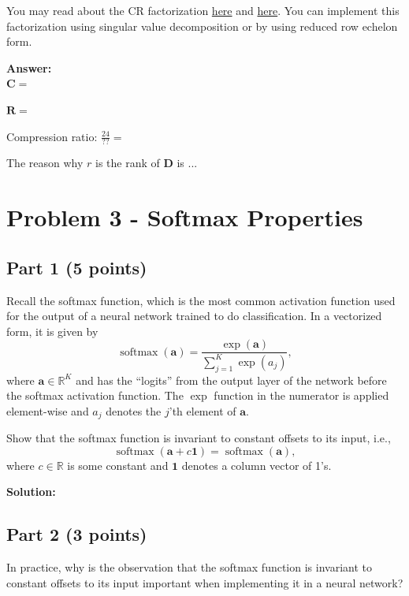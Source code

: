 \documentclass[11pt, oneside]{article}   	%
\begin{document}
You may read about the CR factorization \href{https://blogs.mathworks.com/cleve/2020/10/23/gil-strang-and-the-cr-matrix-factorization/}{here} and \href{https://en.wikipedia.org/wiki/Rank_factorization}{here}. You can implement this factorization using singular value decomposition or by using reduced row echelon form.

\textbf{Answer:} \\

$\mathbf{C} =$ 

$\mathbf{R} =$

Compression ratio: $\frac{24}{??} = $

The reason why $r$ is the rank of $\mathbf{D}$ is ...


\clearpage


\clearpage


\section*{Problem 3 - Softmax Properties}

\subsection*{Part 1 (5 points)}
Recall the softmax function, which is the most common activation function used for the output of a neural network trained to do classification. In a vectorized form, it is given by
\begin{equation*}
\operatorname{softmax} \left( {\mathbf{a}} \right) = \frac{{\exp \left( {\mathbf{a}} \right)}}
{{\sum\nolimits_{j = 1}^K {\exp \left( {a_j } \right)} }},
\end{equation*}
where $\mathbf{a}\in \mathbb{R}^K$ and has the ``logits'' from the output layer of the network before the softmax activation function. The $\exp$ function in the numerator is applied element-wise and $a_j$ denotes the $j$'th element of $\mathbf{a}$.

Show that the softmax function is invariant to constant offsets to its input, i.e., 
\[
\operatorname{softmax} \left( {{\mathbf{a}} + {c\mathbf{1}}} \right) = \operatorname{softmax} \left( {\mathbf{a}} \right),
\]
where $c\in \mathbb{R}$ is some constant and $\mathbf{1}$ denotes a column vector of 1's.

\textbf{Solution:} \\

\subsection*{Part 2 (3 points)}
In practice, why is the observation that the softmax function is invariant to constant offsets to its input important when implementing it in a neural network?
\end{document}
